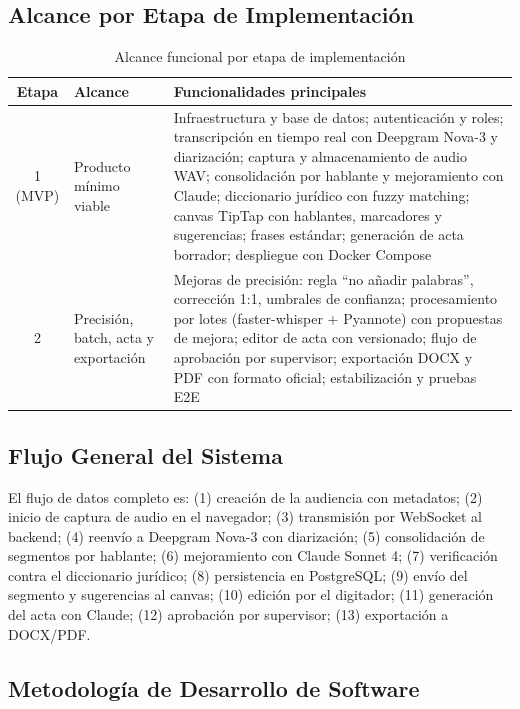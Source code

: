 \documentclass[12pt,a4paper,oneside]{report}
\begin{document}
\subsection{Alcance por Etapa de Implementación}

\begin{table}[H]
\centering
\small
\caption{Alcance funcional por etapa de implementación}
\begin{tabular}{|c|p{2.5cm}|p{9cm}|}
\hline
\rowcolor{gray!20}
\textbf{Etapa} & \textbf{Alcance} & \textbf{Funcionalidades principales} \\
\hline
1 (MVP) & Producto mínimo viable & Infraestructura y base de datos; autenticación y roles; transcripción en tiempo real con Deepgram Nova-3 y diarización; captura y almacenamiento de audio WAV; consolidación por hablante y mejoramiento con Claude; diccionario jurídico con fuzzy matching; canvas TipTap con hablantes, marcadores y sugerencias; frases estándar; generación de acta borrador; despliegue con Docker Compose \\
\hline
2 & Precisión, batch, acta y exportación & Mejoras de precisión: regla ``no añadir palabras'', corrección 1:1, umbrales de confianza; procesamiento por lotes (faster-whisper + Pyannote) con propuestas de mejora; editor de acta con versionado; flujo de aprobación por supervisor; exportación DOCX y PDF con formato oficial; estabilización y pruebas E2E \\
\hline
\end{tabular}
\label{tab:etapas}
\end{table}

\subsection{Flujo General del Sistema}

El flujo de datos completo es: (1) creación de la audiencia con metadatos; (2) inicio de captura de audio en el navegador; (3) transmisión por WebSocket al backend; (4) reenvío a Deepgram Nova-3 con diarización; (5) consolidación de segmentos por hablante; (6) mejoramiento con Claude Sonnet 4; (7) verificación contra el diccionario jurídico; (8) persistencia en PostgreSQL; (9) envío del segmento y sugerencias al canvas; (10) edición por el digitador; (11) generación del acta con Claude; (12) aprobación por supervisor; (13) exportación a DOCX/PDF.

\subsection{Metodología de Desarrollo de Software}
\end{document}
